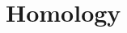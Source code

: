 \documentclass[../../../deep-dive]{subfiles}
\begin{document}

% 


% 


% 


% 

\chapter{Homology}


\end{document}
